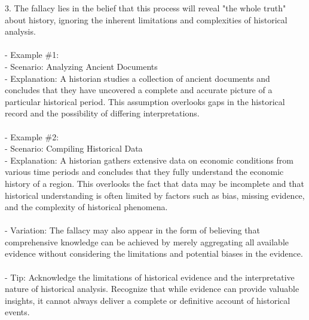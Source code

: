 \documentclass[a4paper,12pt,single,pdftex]{scrartcl}
\begin{document}
    
        3. The fallacy lies in the belief that this process will reveal "the whole truth" about history, ignoring the inherent limitations and complexities of historical analysis.
    \\

    
      
    \\

    
      - Example \#1:
    \\

    
        - Scenario: Analyzing Ancient Documents
    \\

    
        - Explanation: A historian studies a collection of ancient documents and concludes that they have uncovered a complete and accurate picture of a particular historical period. This assumption overlooks gaps in the historical record and the possibility of differing interpretations.
    \\

    
      
    \\

    
      - Example \#2:
    \\

    
        - Scenario: Compiling Historical Data
    \\

    
        - Explanation: A historian gathers extensive data on economic conditions from various time periods and concludes that they fully understand the economic history of a region. This overlooks the fact that data may be incomplete and that historical understanding is often limited by factors such as bias, missing evidence, and the complexity of historical phenomena.
    \\

    
      
    \\

    
      - Variation: The fallacy may also appear in the form of believing that comprehensive knowledge can be achieved by merely aggregating all available evidence without considering the limitations and potential biases in the evidence.
    \\

    
      
    \\

    
      - Tip: Acknowledge the limitations of historical evidence and the interpretative nature of historical analysis. Recognize that while evidence can provide valuable insights, it cannot always deliver a complete or definitive account of historical events.
    \\
\end{document}
